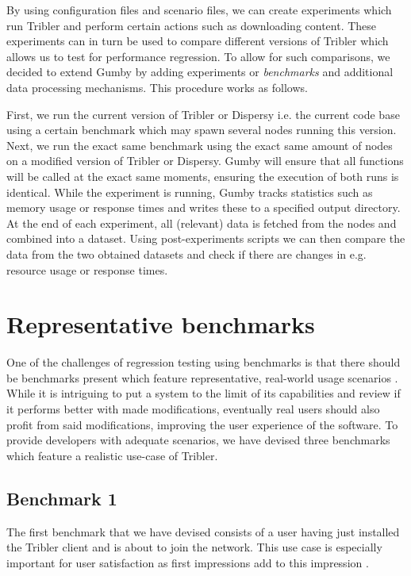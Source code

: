 By using configuration files and scenario files, we can create experiments which run Tribler and perform certain actions such as downloading content.
These experiments can in turn be used to compare different versions of Tribler which allows us to test for performance regression. 
To allow for such comparisons, we decided to extend Gumby by adding experiments or \emph{benchmarks} and additional data processing mechanisms.
This procedure works as follows.

First, we run the current version of Tribler or Dispersy i.e. the current code base using a certain benchmark which may spawn several nodes running this version.
Next, we run the exact same benchmark using the exact same amount of nodes on a modified version of Tribler or Dispersy.
Gumby will ensure that all functions will be called at the exact same moments, ensuring the execution of both runs is identical.
While the experiment is running, Gumby tracks statistics such as memory usage or response times and writes these to a specified output directory.
At the end of each experiment, all (relevant) data is fetched from the nodes and combined into a dataset.
Using post-experiments scripts we can then compare the data from the two obtained datasets and check if there are changes in e.g. resource usage or response times.

\section{Representative benchmarks}

One of the challenges of regression testing using benchmarks is that there should be benchmarks present which feature representative, real-world usage scenarios \cite{ferre2001usability}.
While it is intriguing to put a system to the limit of its capabilities and review if it performs better with made modifications, eventually real users should also profit from said modifications, improving the user experience of the software.
To provide developers with adequate scenarios, we have devised three benchmarks which feature a realistic use-case of Tribler.

\subsection{Benchmark 1}

The first benchmark that we have devised consists of a user having just installed the Tribler client and is about to join the network.
This use case is especially important for user satisfaction as first impressions add to this impression \cite{ferre2001usability}.

